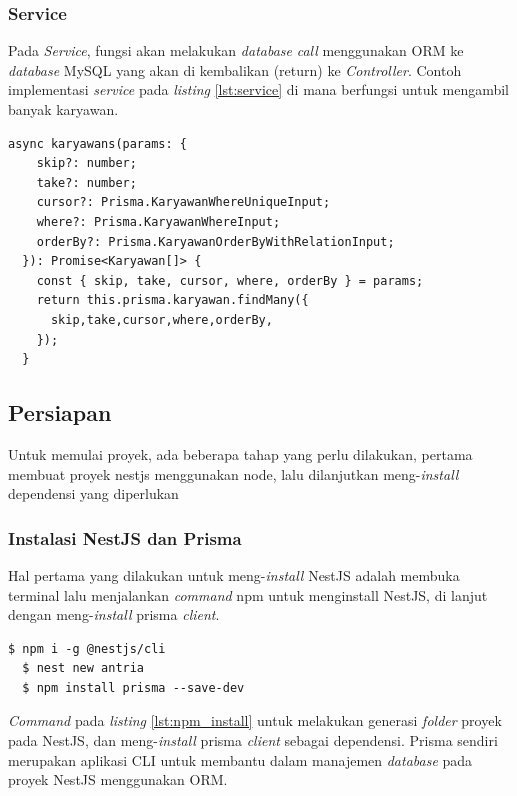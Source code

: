 \subsubsection{Service}
Pada \textit{Service}, fungsi akan melakukan \textit{database} \textit{call} menggunakan ORM ke \textit{database} MySQL yang akan di kembalikan (return) ke \textit{Controller}\cite{NestJS}. Contoh implementasi \textit{service} pada \textit{listing} \ref{lst:service} di mana berfungsi untuk mengambil banyak karyawan.
\begin{lstlisting}[caption={Service},label={lst:service}]
  async karyawans(params: {
    skip?: number;
    take?: number;
    cursor?: Prisma.KaryawanWhereUniqueInput;
    where?: Prisma.KaryawanWhereInput;
    orderBy?: Prisma.KaryawanOrderByWithRelationInput;
  }): Promise<Karyawan[]> {
    const { skip, take, cursor, where, orderBy } = params;
    return this.prisma.karyawan.findMany({
      skip,take,cursor,where,orderBy,
    });
  }
\end{lstlisting}

\subsection{Persiapan}
Untuk memulai proyek, ada beberapa tahap yang perlu dilakukan, pertama membuat proyek nestjs menggunakan node, lalu dilanjutkan meng-\textit{install} dependensi yang diperlukan

\subsubsection{Instalasi NestJS dan Prisma}
Hal pertama yang dilakukan untuk meng-\textit{install} NestJS adalah membuka terminal lalu menjalankan \textit{command} npm untuk menginstall NestJS, di lanjut dengan meng-\textit{install} prisma \textit{client}.
\begin{lstlisting}[caption={terminal: npm},label={lst:npm_install}]
  $ npm i -g @nestjs/cli
  $ nest new antria
  $ npm install prisma --save-dev
\end{lstlisting}
\textit{Command} pada \textit{listing} \ref{lst:npm_install} untuk melakukan generasi \textit{folder} proyek pada NestJS, dan meng-\textit{install} prisma \textit{client} sebagai dependensi. Prisma sendiri merupakan aplikasi CLI untuk membantu dalam manajemen \textit{database} pada proyek NestJS menggunakan ORM.

